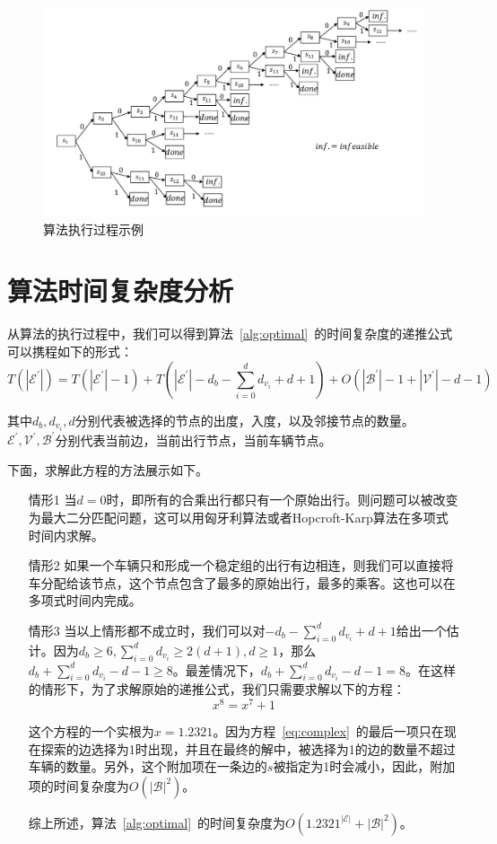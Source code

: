\begin{figure}
\centering
\includegraphics[width=15cm]{./figures/img/Demo_1.pdf}
\caption{算法执行过程示例}
\label{fig:demo}
\end{figure}


\section{算法时间复杂度分析}
从算法的执行过程中，我们可以得到算法~\ref{alg:optimal}~的时间复杂度的递推公式可以携程如下的形式：
\begin{equation}\label{eq:complex}
    T(|\mathcal{E^\prime}|) = T(|\mathcal{E^\prime}| - 1) + T(|\mathcal{E^\prime}| - d_b-\sum_{i = 0}^{d}d_{v_i} +d+1) + O(|\mathcal{B^\prime}|-1+|\mathcal{V^\prime}|-d-1)
\end{equation}
\par
其中$d_b,d_{v_i},d$分别代表被选择的节点的出度，入度，以及邻接节点的数量。$\mathcal{E}^\prime,\mathcal{V}^\prime,\mathcal{B}^\prime$分别代表当前边，当前出行节点，当前车辆节点。
\par
下面，求解此方程的方法展示如下。
\begin{itemize}
	\item[情形1] 当$d=0$时，即所有的合乘出行都只有一个原始出行。则问题可以被改变为最大二分匹配问题，这可以用匈牙利算法或者Hopcroft-Karp算法在多项式时间内求解。
	\item[情形2] 如果一个车辆只和形成一个稳定组的出行有边相连，则我们可以直接将车分配给该节点，这个节点包含了最多的原始出行，最多的乘客。这也可以在多项式时间内完成。
	\item[情形3] 当以上情形都不成立时，我们可以对$- d_b-\sum_{i = 0}^{d}d_{v_i} +d+1$给出一个估计。因为$d_b\geq 6, \sum_{i = 0}^{d}d_{v_i}\geq 2 (d+1),d\geq1$，那么$d_b+\sum_{i = 0}^{d}d_{v_i} -d-1\geq 8$。最差情况下，$d_b+\sum_{i = 0}^{d}d_{v_i} -d-1= 8$。在这样的情形下，为了求解原始的递推公式，我们只需要求解以下的方程：
	\begin{equation}
        x^8 = x^7 +1
    \end{equation}
    \par
    这个方程的一个实根为$x = 1.2321$。因为方程~\ref{eq:complex}~的最后一项只在现在探索的边选择为1时出现，并且在最终的解中，被选择为1的边的数量不超过车辆的数量。另外，这个附加项在一条边的$s$被指定为1时会减小，因此，附加项的时间复杂度为$O(|\mathcal{B}|^2)$。
    \par
    综上所述，算法~\ref{alg:optimal}~的时间复杂度为$O(1.2321^{|\mathcal{E}|}+|\mathcal{B}|^2)$。

\end{itemize}


